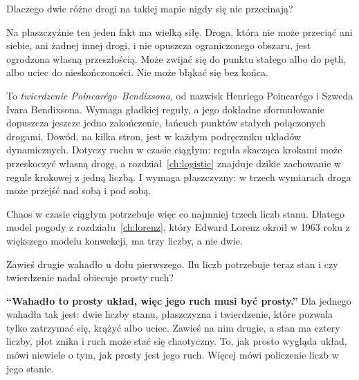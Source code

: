 \begin{think}
Dlaczego dwie różne drogi na takiej mapie nigdy się nie przecinają?
\end{think}
Na płaszczyźnie ten jeden fakt ma wielką siłę. Droga, która nie może
przeciąć ani siebie, ani żadnej innej drogi, i nie opuszcza ograniczonego
obszaru, jest ogrodzona własną przeszłością. Może zwijać się do punktu
stałego albo do pętli, albo uciec do nieskończoności. Nie może błąkać się bez
końca.

\begin{rigourbox}
To \emph{twierdzenie Poincarégo--Bendixsona}, od nazwisk Henriego Poincarégo
i Szweda Ivara Bendixsona. Wymaga gładkiej reguły, a jego
dokładne sformułowanie dopuszcza jeszcze jedno zakończenie, łańcuch punktów
stałych połączonych drogami. Dowód, na kilka stron, jest w każdym podręczniku
układów dynamicznych. Dotyczy ruchu w czasie
ciągłym: reguła skacząca krokami może przeskoczyć własną drogę, a
rozdział~\ref{ch:logistic} znajduje dzikie zachowanie w regule krokowej z
jedną liczbą. I wymaga płaszczyzny: w trzech wymiarach droga może przejść
nad sobą i pod sobą.
\end{rigourbox}

\noindent
Chaos w czasie ciągłym potrzebuje więc co najmniej trzech liczb stanu. Dlatego
model pogody z rozdziału~\ref{ch:lorenz}, który Edward Lorenz okroił w 1963
roku z większego modelu konwekcji, ma trzy liczby, a nie dwie.

\begin{think}
Zawieś drugie wahadło u dołu pierwszego. Ilu liczb potrzebuje teraz stan i
czy twierdzenie nadal obiecuje prosty ruch?
\end{think}

\begin{trapbox}
\textbf{\enquote{Wahadło to prosty układ, więc jego ruch musi być prosty.}}
Dla jednego wahadła tak jest: dwie liczby stanu, płaszczyzna i twierdzenie,
które pozwala tylko zatrzymać się, krążyć albo uciec. Zawieś na nim drugie, a
stan ma cztery liczby, płot znika i ruch może stać się chaotyczny. To, jak
prosto wygląda układ, mówi niewiele o tym, jak prosty jest jego ruch. Więcej
mówi policzenie liczb w jego stanie.
\end{trapbox}

